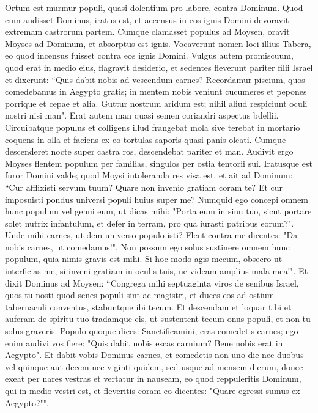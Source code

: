 \begin{biblechapter}  
\verse Ortum est murmur populi, quasi dolentium pro labore, contra Dominum. Quod cum audisset Dominus, iratus est, et accensus in eos ignis Domini devoravit extremam castrorum partem. 
\verse Cumque clamasset populus ad Moysen, oravit Moyses ad Dominum, et absorptus est ignis. 
\verse Vocaverunt nomen loci illius Tabera, eo quod incensus fuisset contra eos ignis Domini. 
\verse Vulgus autem promiscuum, quod erat in medio eius, flagravit desiderio, et sedentes fleverunt pariter filii Israel et dixerunt: “Quis dabit nobis ad vescendum carnes? 
\verse Recordamur piscium, quos comedebamus in Aegypto gratis; in mentem nobis veniunt cucumeres et pepones porrique et cepae et alia. 
\verse Guttur nostrum aridum est; nihil aliud respiciunt oculi nostri nisi man". 
\verse Erat autem man quasi semen coriandri aspectus bdellii. 
\verse Circuibatque populus et colligens illud frangebat mola sive terebat in mortario coquens in olla et faciens ex eo tortulas saporis quasi panis oleati. 
\verse Cumque descenderet nocte super castra ros, descendebat pariter et man. 
\verse Audivit ergo Moyses flentem populum per familias, singulos per ostia tentorii sui. Iratusque est furor Domini valde; quod Moysi intoleranda res visa est,  
\verse et ait ad Dominum: “Cur afflixisti servum tuum? Quare non invenio gratiam coram te? Et cur imposuisti pondus universi populi huius super me? 
\verse Numquid ego concepi omnem hunc populum vel genui eum, ut dicas mihi: "Porta eum in sinu tuo, sicut portare solet nutrix infantulum, et defer in terram, pro qua iurasti patribus eorum?". 
\verse Unde mihi carnes, ut dem universo populo isti? Flent contra me dicentes: "Da nobis carnes, ut comedamus!". 
\verse Non possum ego solus sustinere omnem hunc populum, quia nimis gravis est mihi. 
\verse Si hoc modo agis mecum, obsecro ut interficias me, si inveni gratiam in oculis tuis, ne videam amplius mala mea!". 
\verse Et dixit Dominus ad Moysen: “Congrega mihi septuaginta viros de senibus Israel, quos tu nosti quod senes populi sint ac magistri, et duces eos ad ostium tabernaculi conventus, stabuntque ibi tecum. 
\verse Et descendam et loquar tibi et auferam de spiritu tuo tradamque eis, ut sustentent tecum onus populi, et non tu solus graveris. 
\verse Populo quoque dices: Sanctificamini, cras comedetis carnes; ego enim audivi vos flere: "Quis dabit nobis escas carnium? Bene nobis erat in Aegypto". Et dabit vobis Dominus carnes, et comedetis 
\verse non uno die nec duobus vel quinque aut decem nec viginti quidem, 
\verse sed usque ad mensem dierum, donec exeat per nares vestras et vertatur in nauseam, eo quod reppuleritis Dominum, qui in medio vestri est, et fleveritis coram eo dicentes: "Quare egressi sumus ex Aegypto?"". 

\end{biblechapter}
